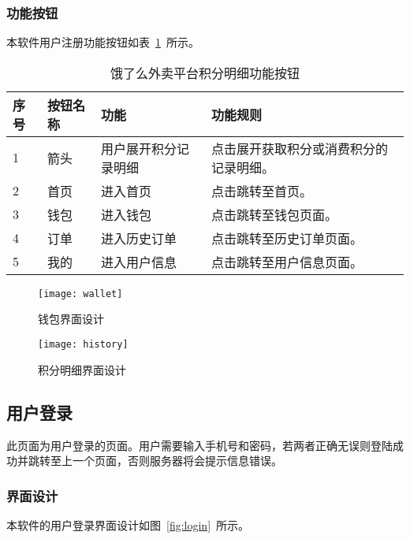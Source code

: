 \subsubsection{功能按钮}
本软件用户注册功能按钮如表~\ref{tab:table9}~所示。
\begin{table}[htbp]
    \caption{饿了么外卖平台积分明细功能按钮}\label{tab:table9}
    \vspace{0.5em}\wuhao
    \begin{tabularx}{\textwidth}{lllX}
    \toprule[1.5pt]
    序号 & 按钮名称 & 功能 & 功能规则 \\ 
    \midrule[1pt]
    1 & 箭头 & 用户展开积分记录明细 & 点击展开获取积分或消费积分的记录明细。 \\
    2 & 首页 & 进入首页 & 点击跳转至首页。 \\
    3 & 钱包 & 进入钱包 & 点击跳转至钱包页面。 \\
    4 & 订单 & 进入历史订单 & 点击跳转至历史订单页面。 \\
    5 & 我的 & 进入用户信息 & 点击跳转至用户信息页面。 \\
\bottomrule[1.5pt]
\end{tabularx}
\vspace{\baselineskip}
\end{table}
\begin{figure}[htbp]
    \centering
    \begin{minipage}{0.4\textwidth}
    \centering
    \texttt{[image: wallet]}
    \caption{钱包界面设计}\label{fig:wallet}
    \end{minipage}
    \begin{minipage}{0.4\textwidth}
    \centering
    \texttt{[image: history]}
    \caption{积分明细界面设计}\label{fig:history}
    \end{minipage}
    \vspace{\baselineskip}
\end{figure}

\subsection{用户登录}
此页面为用户登录的页面。用户需要输入手机号和密码，若两者正确无误则登陆成功并跳转至上一个页面，否则服务器将会提示信息错误。
\subsubsection{界面设计}
本软件的用户登录界面设计如图~\ref{fig:login}~所示。
